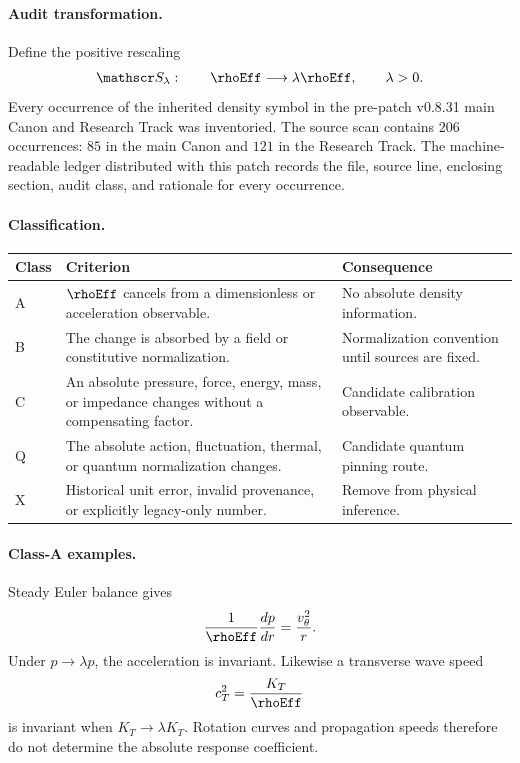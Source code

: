 \paragraph{Audit transformation.}
Define the positive rescaling
\begin{align}
    \mathscr S_\lambda:
    \qquad
    \rhoEff
    \longrightarrow
    \lambda\rhoEff,
    \qquad
    \lambda>0.
    \label{eq:rt_rhof_scaling_transformation}
\end{align}
Every occurrence of the inherited density symbol in the pre-patch
v0.8.31 main Canon and Research Track was inventoried.  The source scan
contains \(206\) occurrences: \(85\) in the main Canon and \(121\) in the
Research Track.  The machine-readable ledger distributed with this patch
records the file, source line, enclosing section, audit class, and rationale
for every occurrence.

\paragraph{Classification.}
\begin{center}
\begin{tabularx}{0.97\textwidth}{@{}lXl@{}}
\toprule
Class & Criterion & Consequence \\
\midrule
A & \(\rhoEff\) cancels from a dimensionless or acceleration observable. &
No absolute density information. \\
B & The change is absorbed by a field or constitutive normalization. &
Normalization convention until sources are fixed. \\
C & An absolute pressure, force, energy, mass, or impedance changes without a
compensating factor. & Candidate calibration observable. \\
Q & The absolute action, fluctuation, thermal, or quantum normalization changes. &
Candidate quantum pinning route. \\
X & Historical unit error, invalid provenance, or explicitly legacy-only number. &
Remove from physical inference. \\
\bottomrule
\end{tabularx}
\end{center}

\paragraph{Class-A examples.}
Steady Euler balance gives
\begin{align}
    \frac{1}{\rhoEff}\frac{dp}{dr}
    =
    \frac{v_\theta^2}{r}.
\end{align}
Under \(p\to\lambda p\), the acceleration is invariant.  Likewise a
transverse wave speed
\begin{align}
    c_T^2=\frac{K_T}{\rhoEff}
\end{align}
is invariant when \(K_T\to\lambda K_T\).  Rotation curves and propagation
speeds therefore do not determine the absolute response coefficient.

